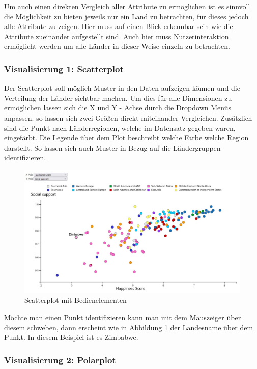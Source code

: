 Um auch einen direkten Vergleich aller Attribute zu ermöglichen ist es sinnvoll die Möglichkeit zu bieten jeweils nur ein Land zu betrachten, für dieses jedoch alle Attribute zu zeigen. Hier muss auf einen Blick erkennbar sein wie die Attribute zueinander aufgestellt sind. Auch hier muss Nutzerinteraktion ermöglicht werden um alle Länder in dieser Weise einzeln zu betrachten. \\

\subsubsection{Visualisierung 1: Scatterplot}

Der Scatterplot soll möglich Muster in den Daten aufzeigen können und die Verteilung der Länder sichtbar machen. Um dies für alle Dimensionen zu ermöglichen lassen sich die X und Y - Achse durch die Dropdown Menüs anpassen. so lassen sich zwei Größen direkt miteinander Vergleichen. Zusätzlich sind die Punkt nach Länderregionen, welche im Datensatz gegeben waren, eingefärbt. Die Legende über dem Plot beschreibt welche Farbe welche Region darstellt. So lassen sich auch Muster in Bezug auf die Ländergruppen identifizieren. \\

\begin{figure}[h]
 \centering
 \includegraphics[width = \textwidth]{img/scatterplot.jpg}
 \caption{Scatterplot mit Bedienelementen}
 \label{fig:scatterplot}
\end{figure}

Möchte man einen Punkt identifizieren kann man mit dem Mauszeiger über diesem schweben, dann erscheint wie in Abbildung \ref{fig:scatterplot} der Landesname über dem Punkt. In diesem Beispiel ist es Zimbabwe. 


\subsubsection{Visualisierung 2: Polarplot}

